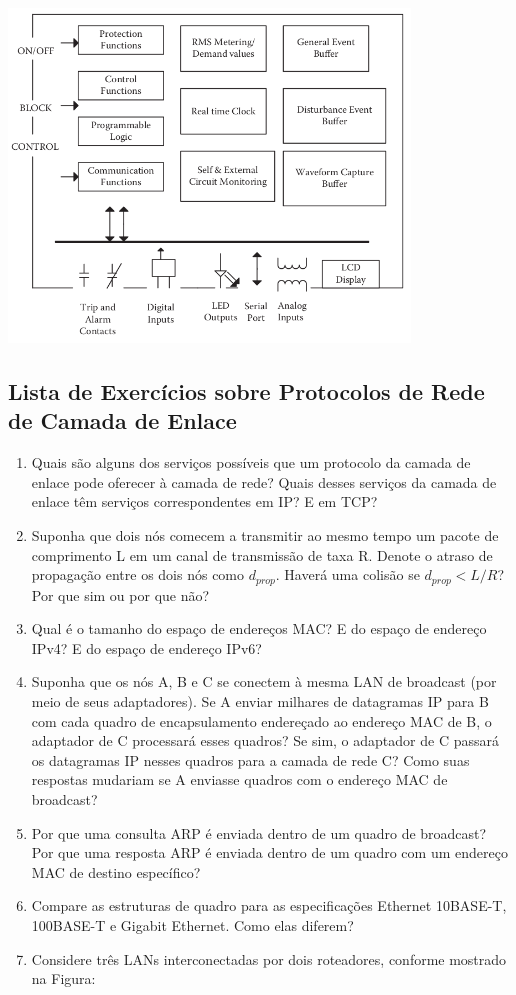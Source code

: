 \includegraphics[width=0.8\textwidth,height=\textheight]{Figuras/fig2.png}

\hypertarget{lista-de-exercuxedcios-sobre-protocolos-de-rede-de-camada-de-enlace}{%
\subsection{Lista de Exercícios sobre Protocolos de Rede de Camada de
Enlace}\label{lista-de-exercuxedcios-sobre-protocolos-de-rede-de-camada-de-enlace}}

\begin{enumerate}
\def\labelenumi{\arabic{enumi}.}
\item
  Quais são alguns dos serviços possíveis que um protocolo da camada de
  enlace pode oferecer à camada de rede? Quais desses serviços da camada
  de enlace têm serviços correspondentes em IP? E em TCP?
\item
  Suponha que dois nós comecem a transmitir ao mesmo tempo um pacote de
  comprimento L em um canal de transmissão de taxa R. Denote o atraso de
  propagação entre os dois nós como \(d_{prop}\). Haverá uma colisão se
  \(d_{prop} < L/R\)? Por que sim ou por que não?
\item
  Qual é o tamanho do espaço de endereços MAC? E do espaço de endereço
  IPv4? E do espaço de endereço IPv6?
\item
  Suponha que os nós A, B e C se conectem à mesma LAN de broadcast (por
  meio de seus adaptadores). Se A enviar milhares de datagramas IP para
  B com cada quadro de encapsulamento endereçado ao endereço MAC de B, o
  adaptador de C processará esses quadros? Se sim, o adaptador de C
  passará os datagramas IP nesses quadros para a camada de rede C? Como
  suas respostas mudariam se A enviasse quadros com o endereço MAC de
  broadcast?
\item
  Por que uma consulta ARP é enviada dentro de um quadro de broadcast?
  Por que uma resposta ARP é enviada dentro de um quadro com um endereço
  MAC de destino específico?
\item
  Compare as estruturas de quadro para as especificações Ethernet
  10BASE-T, 100BASE-T e Gigabit Ethernet. Como elas diferem?
\item
  Considere três LANs interconectadas por dois roteadores, conforme
  mostrado na Figura:
\end{enumerate}

